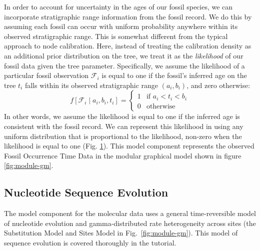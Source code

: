 In order to account for uncertainty in the ages of our fossil species, we can incorporate stratigraphic range information from the fossil record.
We do this by assuming each fossil can occur with uniform probability anywhere within its observed stratigraphic range.
This is somewhat different from the typical approach to node calibration.
Here, instead of treating the calibration density as an additional prior distribution on the tree, we treat it as the \textit{likelihood} of our fossil data given the tree parameter.
Specifically, we assume the likelihood of a particular fossil observation $\mathcal{F}_i$ is equal to one if the fossil's inferred age on the tree $t_i$ falls within its observed stratigraphic range $(a_i,b_i)$, and zero otherwise:
$$f[\mathcal{F}_i \mid a_i, b_i, t_i] = \begin{cases}
1 & \text{if } a_i < t_i < b_i\\
0 & \text{otherwise}
\end{cases}$$
In other words, we assume the likelihood is equal to one if the inferred age is consistent with the fossil record.
We can represent this likelihood in \RevBayes using any uniform distribution that is proportional to the likelihood, \IE non-zero when the likelihood is equal to one (Fig. \ref{fig:tipsampling_gm}).
This model component represents the observed \textsf{Fossil Occurrence Time Data} in the modular graphical model shown in figure \ref{fig:module-gm}.
\begin{figure}[h!]
\label{fig:tipsampling_gm}
\end{figure}


\subsection{Nucleotide Sequence Evolution}\label{subsect:Intro-GTR}

The model component for the molecular data uses a general time-reversible model of nucleotide evolution and gamma-distributed rate heterogeneity across sites (the \textsf{Substitution Model} and \textsf{Sites Model} in Fig.\ \ref{fig:module-gm}). %
This model of sequence evolution is covered thoroughly in the \href{https://github.com/revbayes/revbayes_tutorial/raw/master/tutorial_TeX/RB_CTMC_Tutorial/RB_CTMC_Tutorial.pdf}{} tutorial.


